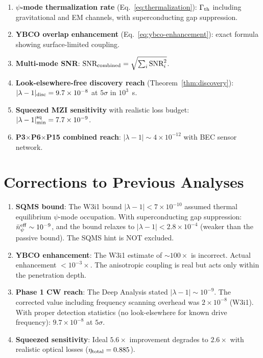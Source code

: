 \documentclass[11pt]{article}
\newcommand{\ee}[1]{\times 10^{#1}}
\newcommand{\lam}{\lambda}
\begin{document}
\begin{enumerate}
\item \textbf{$\psi$-mode thermalization rate}
(Eq.~\ref{eq:thermalization}): $\Gamma_{\rm th}$
including gravitational and EM channels, with superconducting
gap suppression.

\item \textbf{YBCO overlap enhancement} (Eq.~\ref{eq:ybco-enhancement}):
exact formula showing surface-limited coupling.

\item \textbf{Multi-mode SNR}: $\text{SNR}_{\rm combined}
= \sqrt{\sum_i \text{SNR}_i^2}$.

\item \textbf{Look-elsewhere-free discovery reach}
(Theorem~\ref{thm:discovery}): $|\lam-1|_{\rm disc} = 9.7\ee{-8}$
at $5\sigma$ in $10^3$~s.

\item \textbf{Squeezed MZI sensitivity} with realistic loss budget:
$|\lam-1|_{\rm min}^{\rm sq} = 7.7\ee{-9}$.

\item \textbf{P3$\times$P6$\times$P15 combined reach}:
$|\lam-1| \sim 4\ee{-12}$ with BEC sensor network.
\end{enumerate}

\section*{Corrections to Previous Analyses}

\begin{enumerate}
\item \textbf{SQMS bound}: The W3i1 bound $|\lam-1| < 7\ee{-10}$
assumed thermal equilibrium $\psi$-mode occupation. With
superconducting gap suppression: $\bar{n}_\psi^{\rm eff} \sim 10^{-9}$,
and the bound relaxes to $|\lam-1| < 2.8\ee{-4}$ (weaker than
the passive bound). The SQMS hint is NOT excluded.

\item \textbf{YBCO enhancement}: The W3i1 estimate of $\sim 100\times$
is incorrect. Actual enhancement $< 10^{-3}\times$. The anisotropic
coupling is real but acts only within the penetration depth.

\item \textbf{Phase 1 CW reach}: The Deep Analysis stated
$|\lam-1| \sim 10^{-9}$. The corrected value including
frequency scanning overhead was $2\ee{-8}$ (W3i1). With
proper detection statistics (no look-elsewhere for known
drive frequency): $9.7\ee{-8}$ at $5\sigma$.

\item \textbf{Squeezed sensitivity}: Ideal $5.6\times$ improvement
degrades to $2.6\times$ with realistic optical losses
($\eta_{\rm total} = 0.885$).
\end{enumerate}
\end{document}
